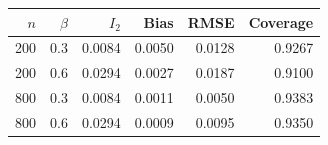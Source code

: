 \begin{tabular}{rrrrrr}
\toprule
$n$ & $\beta$ & $I_2$ & Bias & RMSE & Coverage\\
\midrule
200 & 0.3 & 0.0084 & 0.0050 & 0.0128 & 0.9267\\
200 & 0.6 & 0.0294 & 0.0027 & 0.0187 & 0.9100\\
800 & 0.3 & 0.0084 & 0.0011 & 0.0050 & 0.9383\\
800 & 0.6 & 0.0294 & 0.0009 & 0.0095 & 0.9350\\
\bottomrule
\end{tabular}
